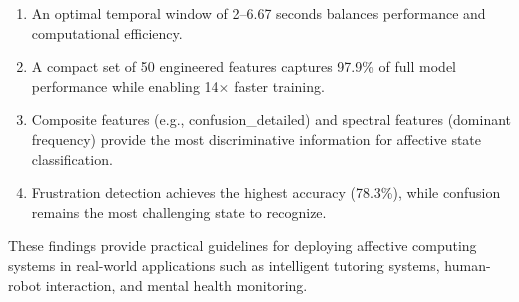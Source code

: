 \begin{enumerate}
    \item An optimal temporal window of 2--6.67 seconds balances performance and computational efficiency.
    
    \item A compact set of 50 engineered features captures 97.9\% of full model performance while enabling 14$\times$ faster training.
    
    \item Composite features (e.g., confusion\_detailed) and spectral features (dominant frequency) provide the most discriminative information for affective state classification.
    
    \item Frustration detection achieves the highest accuracy (78.3\%), while confusion remains the most challenging state to recognize.
\end{enumerate}

These findings provide practical guidelines for deploying affective computing systems in real-world applications such as intelligent tutoring systems, human-robot interaction, and mental health monitoring.
